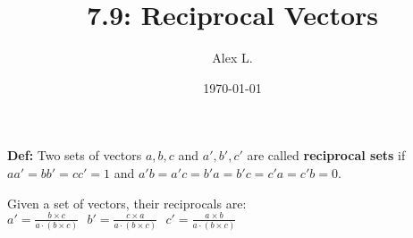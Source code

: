 \documentclass{article}
\title{7.9: Reciprocal Vectors}
\author{Alex L.}
\date{\today}
\begin{document}
\maketitle
\textbf{Def:} Two sets of vectors $a,b,c$ and $a',b',c'$ are called \textbf{reciprocal sets} if $aa' = bb' = cc' = 1$ and $a'b = a'c = b'a = b'c = c'a = c'b = 0$.

Given a set of vectors, their reciprocals are: $a' = \frac{b\times c}{a\cdot(b\times c)} \ \ \ b' = \frac{c\times a}{a \cdot (b\times c)}\ \ \ c' = \frac{a \times b}{a\cdot (b\times c)}$
\end{document}
